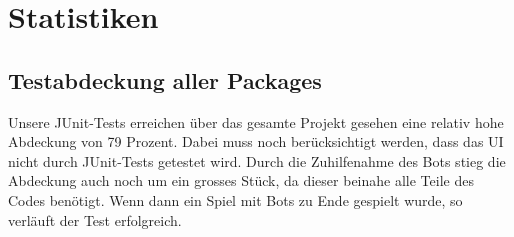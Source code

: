 \documentclass[12pt,halfparskip]{scrartcl}
\begin{document}
\section{Statistiken}
\subsection{Testabdeckung aller Packages}

Unsere JUnit-Tests erreichen über das gesamte Projekt gesehen eine relativ hohe Abdeckung von 79 Prozent. Dabei muss noch berücksichtigt werden, dass das UI nicht durch JUnit-Tests getestet wird. Durch die Zuhilfenahme des Bots stieg die Abdeckung auch noch um ein grosses Stück, da dieser beinahe alle Teile des Codes benötigt. Wenn dann ein Spiel mit Bots zu Ende gespielt wurde, so verläuft der Test erfolgreich.
\end{document}
